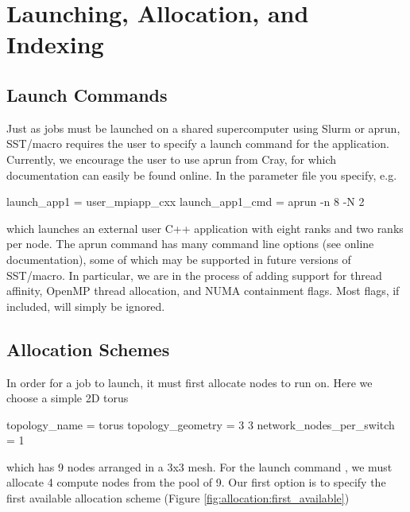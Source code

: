
\section{Launching, Allocation, and Indexing}
\label{sec:tutorial:launchetc}

\subsection{Launch Commands}
\label{subsec:tutorial:launch}
Just as jobs must be launched on a shared supercomputer using Slurm or aprun, 
SST/macro requires the user to specify a launch command for the application.
Currently, we encourage the user to use aprun from Cray, for which documentation can easily be found online.
In the parameter file you specify, e.g.

\begin{ViFile}
launch_app1 = user_mpiapp_cxx
launch_app1_cmd = aprun -n 8 -N 2
\end{ViFile}
which launches an external user C++ application with eight ranks and two ranks per node.
The aprun command has many command line options (see online documentation), some of which may be supported in future versions of SST/macro.  In particular, we are in the process of adding support for thread affinity, OpenMP thread allocation, and NUMA containment flags.  Most flags, if included, will simply be ignored.

\subsection{Allocation Schemes}
\label{subsec:tutorial:allocation}
In order for a job to launch, it must first allocate nodes to run on. Here we choose a simple 2D torus

\begin{ViFile}
topology_name = torus
topology_geometry = 3 3
network_nodes_per_switch = 1
\end{ViFile}
which has 9 nodes arranged in a 3x3 mesh.  
For the launch command , we must allocate 4 compute nodes from the pool of 9.
Our first option is to specify the first available allocation scheme (Figure \ref{fig:allocation:first_available})

